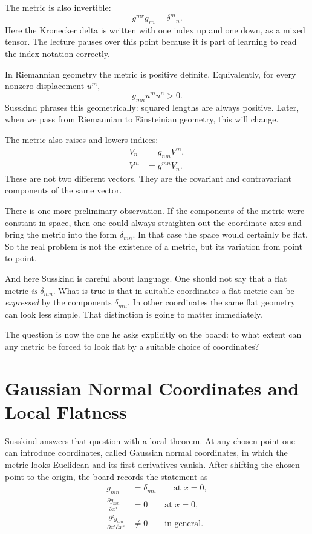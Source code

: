 The metric is also invertible:
\begin{equation}
g^{mr}g_{rn}=\delta^m{}_n.
\end{equation}
Here the Kronecker delta is written with one index up and one down, as a mixed tensor. The lecture pauses over this point because it is part of learning to read the index notation correctly.

In Riemannian geometry the metric is positive definite. Equivalently, for every nonzero displacement \(u^m\),
\begin{equation}
g_{mn}u^m u^n>0.
\end{equation}
Susskind phrases this geometrically: squared lengths are always positive. Later, when we pass from Riemannian to Einsteinian geometry, this will change.

The metric also raises and lowers indices:
\begin{align}
V_n &= g_{nm}V^m,\\
V^m &= g^{mn}V_n.
\end{align}
These are not two different vectors. They are the covariant and contravariant components of the same vector.

There is one more preliminary observation. If the components of the metric were constant in space, then one could always straighten out the coordinate axes and bring the metric into the form \(\delta_{mn}\). In that case the space would certainly be flat. So the real problem is not the existence of a metric, but its variation from point to point.

And here Susskind is careful about language. One should not say that a flat metric \emph{is} \(\delta_{mn}\). What is true is that in suitable coordinates a flat metric can be \emph{expressed} by the components \(\delta_{mn}\). In other coordinates the same flat geometry can look less simple. That distinction is going to matter immediately.

The question is now the one he asks explicitly on the board: to what extent can any metric be forced to look flat by a suitable choice of coordinates?

\section{Gaussian Normal Coordinates and Local Flatness}

Susskind answers that question with a local theorem. At any chosen point one can introduce coordinates, called Gaussian normal coordinates, in which the metric looks Euclidean and its first derivatives vanish. After shifting the chosen point to the origin, the board records the statement as
\begin{align}
g_{mn} &= \delta_{mn} \qquad \text{at } x=0,\\
\frac{\partial g_{mn}}{\partial x^r} &= 0 \qquad \text{at } x=0,\\
\frac{\partial^2 g_{mn}}{\partial x^r \partial x^s} &\neq 0
\qquad \text{in general.}
\end{align}

